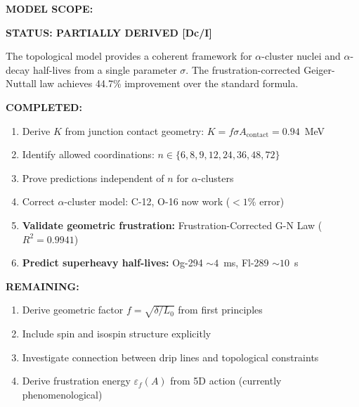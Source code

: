 \begin{tcolorbox}[colback=blue!5!white, colframe=blue!75!black, breakable, title=Topological Pinning Model: Final Verdict]
\textbf{MODEL SCOPE:}
\begin{center}
\end{center}

\textbf{STATUS: PARTIALLY DERIVED [Dc/I]}

The topological model provides a coherent framework for $\alpha$-cluster nuclei and $\alpha$-decay half-lives from a single parameter $\sigma$. The frustration-corrected Geiger-Nuttall law achieves 44.7\% improvement over the standard formula.

\textbf{COMPLETED:}
\begin{enumerate}
    \item[\checkmark] Derive $K$ from junction contact geometry: $K = f \sigma A_{\text{contact}} = 0.94$~MeV
    \item[\checkmark] Identify allowed coordinations: $n \in \{6, 8, 9, 12, 24, 36, 48, 72\}$
    \item[\checkmark] Prove predictions independent of $n$ for $\alpha$-clusters
    \item[\checkmark] Correct $\alpha$-cluster model: C-12, O-16 now work ($<1\%$ error)
    \item[\checkmark] \textbf{Validate geometric frustration:} Frustration-Corrected G-N Law ($R^2 = 0.9941$)
    \item[\checkmark] \textbf{Predict superheavy half-lives:} Og-294 $\sim 4$~ms, Fl-289 $\sim 10$~s
\end{enumerate}

\textbf{REMAINING:}
\begin{enumerate}
    \item Derive geometric factor $f = \sqrt{\delta/L_0}$ from first principles
    \item Include spin and isospin structure explicitly
    \item Investigate connection between drip lines and topological constraints
    \item Derive frustration energy $\varepsilon_f(A)$ from 5D action (currently phenomenological)
\end{enumerate}


\end{tcolorbox}
